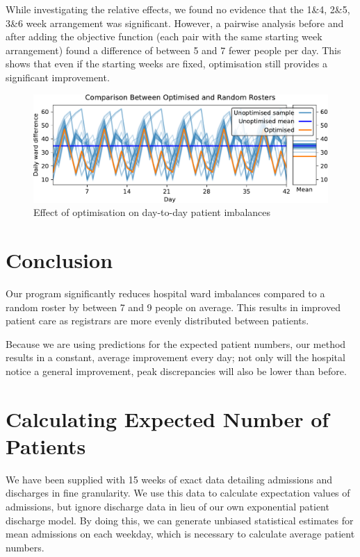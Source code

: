 \documentclass[a4paper]{article}
\begin{document}
While investigating the relative effects, we found no evidence that the 1\&4, 2\&5, 3\&6 week arrangement was significant. However, a pairwise analysis before and after adding the objective function (each pair with the same starting week arrangement) found a difference of between 5 and 7 fewer people per day. This shows that even if the starting weeks are fixed, optimisation still provides a significant improvement.

\begin{figure}[h]
    \centering\includegraphics[width=\linewidth]{../results/comparison}
    \caption{Effect of optimisation on day-to-day patient imbalances}
    \label{fig:comparison}
\end{figure}

\section{Conclusion}

Our program significantly reduces hospital ward imbalances compared to a random roster by between 7 and 9 people on average. This results in improved patient care as registrars are more evenly distributed between patients.

Because we are using predictions for the expected patient numbers, our method results in a constant, average improvement every day; not only will the hospital notice a general improvement, peak discrepancies will also be lower than before.

\newpage
\appendix
\iffalse
\section{Calculating Expected Number of Patients}

We have been supplied with 15 weeks of exact data detailing admissions and discharges in fine granularity. We use this data to calculate expectation values of admissions, but ignore discharge data in lieu of our own exponential patient discharge model. By doing this, we can generate unbiased statistical estimates for mean admissions on each weekday, which is necessary to calculate average patient numbers.
\end{document}
